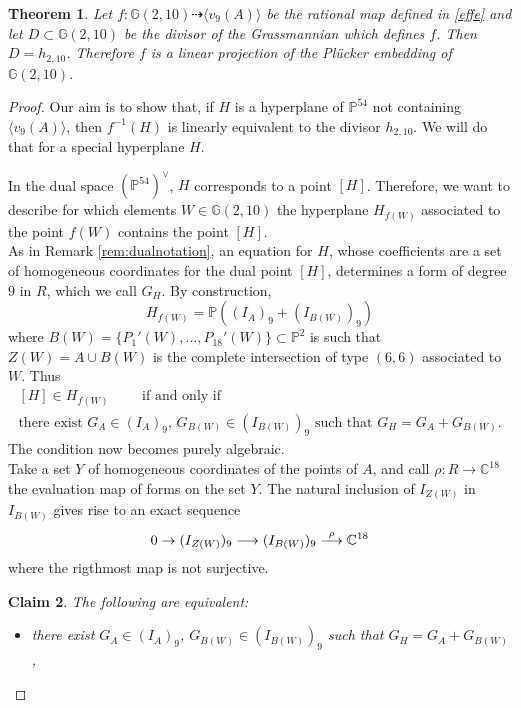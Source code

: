 \documentclass{amsart}
\newcommand{\C}{\mathbb{C}}
\newcommand{\Pj}{\mathbb{P}}
\newcommand{\G}{\mathbb{G}}
\newtheorem{thm0}{Theorem}[section]
\newtheorem{claim0}[thm0]{Claim}
\theoremstyle{definition}
\begin{document}
\begin{thm0}
Let $f : \G(2,10) \dasharrow \langle v_9(A) \rangle$ be the rational map defined in \eqref{effe} and let $ D \subset \G(2,10) $ 
be the divisor of the Grassmannian which defines $ f $. Then $ D = h_{2,10} $. Therefore $ f $ is a linear projection of 
the Pl\"ucker embedding of $ \G(2,10) $.
\end{thm0}
\begin{proof}
Our aim is to show that, if $H$ is a  hyperplane of $\Pj^{54}$ not containing $\langle v_9(A) \rangle$, then 
$ f^{-1}(H)$ is linearly equivalent to the divisor $ h_{2,10}. $
We will do that for a special hyperplane $H$.

In the dual space $(\Pj^{54})^{\vee}$, $H$ corresponds to a point $[H]$. Therefore, we want to describe for which elements $ W \in \G(2,10) $ 
the hyperplane $H_{f(W)}$  associated to the point $ f(W) $  contains the point $ [H] $. \\
As in Remark \ref{rem:dualnotation}, an equation for $H$, whose coefficients are a set of homogeneous coordinates for the dual point $[H]$, 
determines a form of degree $9$ in $R$, which we call $G_H$. 
By construction, 
$$ H_{f(W)} = \Pj((I_{A})_9 + (I_{B(W)})_9) $$
where $ B(W) = \{P_{1}'(W), \dots, P_{18}'(W)\} \subset \Pj^{2} $ is such that $ Z(W) = A \cup B(W) $ 
is the complete intersection of type $ (6,6) $ associated to $ W $. Thus
\begin{multline}\label{eq:iff1}
[H] \in H_{f(W)}\qquad \mbox{ if and only if } \\ \mbox{there exist } G_{A} \in (I_{A})_9,\, G_{B(W)} \in (I_{B(W)})_9 
\mbox{ such that } G_{H} = G_{A} + G_{B(W)}. 
\end{multline}
The condition now becomes purely algebraic.\\
Take a set $Y$ of homogeneous coordinates of the points of $A$, and call $\rho: R\to \C^{18}$ the evaluation map of forms on the set $Y$.
The natural inclusion of $I_{Z(W)}$ in $I_{B(W)}$ gives rise to an exact sequence
\begin{equation}\label{eq:coomA}
0 \to (I_{Z(W)})_9 \longrightarrow (I_{B(W)})_9 \buildrel \rm {\rho} \over  \longrightarrow \C^{18}
\end{equation} 
where the rigthmost map is not surjective.
\begin{claim0}\label{cl:equivalence}
The following are equivalent:
\begin{itemize}
\item[$(i)$] there exist $G_{A} \in (I_A)_9$, $G_{B(W)} \in (I_{B(W)})_9$ such that $G_H = G_{A} + G_{B(W)} $,

\end{itemize}
\end{claim0}
\end{proof}
\end{document}
